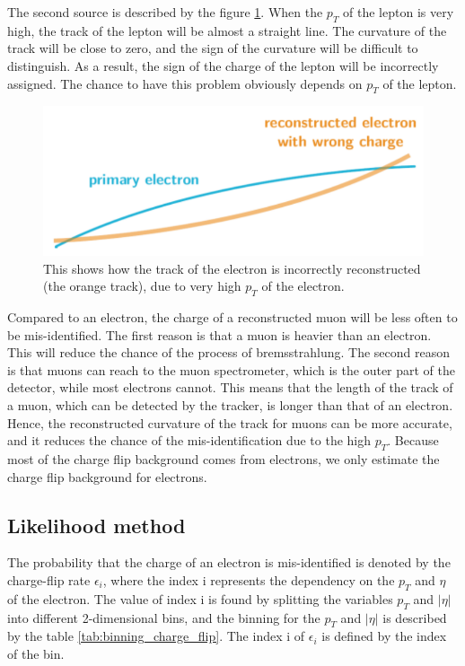 The second source is described by the figure \ref{fig:charge_flip_high_pt}.
When the $p_T$ of the lepton is very high, the track of the lepton will be almost a straight line.
The curvature of the track will be close to zero, and the sign of the curvature will be difficult to distinguish.
As a result, the sign of the charge of the lepton will be incorrectly assigned.
The chance to have this problem obviously depends on $p_T$ of the lepton.

\begin{figure}
\centering
\includegraphics[width=\textwidth]{data/photo/charge_flip/WrongTrack.png}
\caption{This shows how the track of the electron is incorrectly reconstructed (the orange track), due to very high $p_T$ of the electron.}
\label{fig:charge_flip_high_pt}
\end{figure}

Compared to an electron, the charge of a reconstructed muon will be less often to be mis-identified.
The first reason is that a muon is heavier than an electron.
This will reduce the chance of the process of bremsstrahlung.
The second reason is that muons can reach to the muon spectrometer, which is the outer part of the detector, while most electrons cannot.
This means that the length of the track of a muon, which can be detected by the tracker, is longer than that of an electron.
Hence, the reconstructed curvature of the track for muons can be more accurate, and it reduces the chance of the mis-identification due to the high $p_T$.
Because most of the charge flip background comes from electrons, we only estimate the charge flip background for electrons.

\subsection{Likelihood method}
\label{sec:likelihood_method}
The probability that the charge of an electron is mis-identified is denoted by the charge-flip rate $\epsilon_i$, where the index i represents the dependency on the $p_T$ and $\eta$ of the electron.
The value of index i is found by splitting the variables $p_T$ and $|\eta|$ into different 2-dimensional bins, and the binning for the $p_T$ and $|\eta|$ is described by the table \ref{tab:binning_charge_flip}. The index i of $\epsilon_i$ is defined by the index of the bin.

